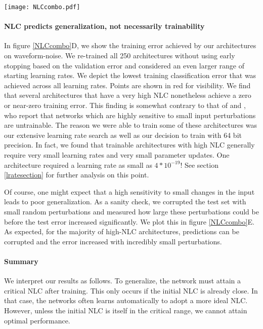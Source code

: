 \documentclass{article} %
\begin{document}
\begin{figure*}[!ht]
\centering
\texttt{[image: NLCcombo.pdf]}
\caption{Detailed results from our empirical study. See main text for explanation and sections \ref{nlcTestDetails} (figures A/B/C/D/F) and \ref{errorRobustnessDetails} (figure E) for further details.}\label{NLCcombo}
\end{figure*}

\paragraph{NLC predicts generalization, not necessarily trainability} In figure \ref{NLCcombo}D, we show the training error achieved by our architectures on waveform-noise. We re-trained all 250 architectures without using early stopping based on the validation error and considered an even larger range of starting learning rates. We depict the lowest training classification error that was achieved across all learning rates. Points are shown in red for visibility. We find that several architectures that have a very high NLC nonetheless achieve a zero or near-zero training error. This finding is somewhat contrary to that of \citet{depthScalesMeanField} and \citet{meanFieldCNN}, who report that networks which are highly sensitive to small input perturbations are untrainable. The reason we were able to train some of these architectures was our extensive learning rate search as well as our decision to train with 64 bit precision. In fact, we found that trainable architectures with high NLC generally require very small learning rates and very small parameter updates. One architecture required a learning rate as small as $4*10^{-19}$! See section \ref{lratesection} for further analysis on this point.

Of course, one might expect that a high sensitivity to small changes in the input leads to poor generalization. As a sanity check, we corrupted the test set with small random perturbations and measured how large these perturbations could be before the test error increased significantly. We plot this in figure \ref{NLCcombo}E. As expected, for the majority of high-NLC architectures, predictions can be corrupted and the error increased with incredibly small perturbations. 


\paragraph{Summary} We interpret our results as follows. To generalize, the network must attain a critical NLC after training. This only occurs if the initial NLC is already close. In that case, the networks often learns automatically to adopt a more ideal NLC. However, unless the initial NLC is itself in the critical range, we cannot attain optimal performance.
\end{document}
